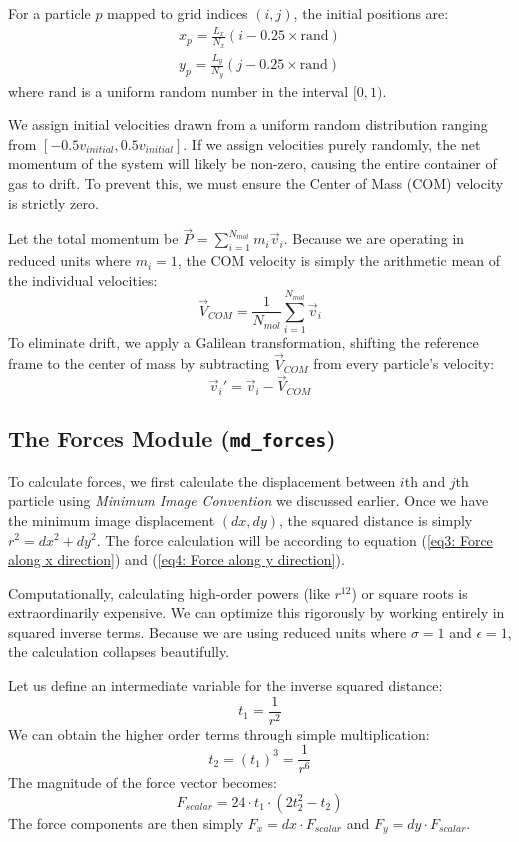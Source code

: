\documentclass[12pt, a4paper, oneside]{article}
\begin{document}
        For a particle $p$ mapped to grid indices $(i, j)$, the initial positions are:
        \begin{eqnarray*}
            x_p = \frac{L_x}{N_x}(i - 0.25 \times \text{rand}) \\
            y_p = \frac{L_y}{N_y}(j - 0.25 \times \text{rand})
        \end{eqnarray*}
        where $\text{rand}$ is a uniform random number in the interval $[0, 1)$.

        We assign initial velocities drawn from a uniform random distribution ranging from $[-0.5 v_{initial}, 0.5 v_{initial}]$. If we assign velocities purely randomly, the net momentum of the system will likely be non-zero, causing the entire container of gas to drift. To prevent this, we must ensure the Center of Mass (COM) velocity is strictly zero.
        
        Let the total momentum be $\vec{P} = \sum_{i=1}^{N_{mol}} m_i \vec{v}_i$. Because we are operating in reduced units where $m_i = 1$, the COM velocity is simply the arithmetic mean of the individual velocities:$$\vec{V}_{COM} = \frac{1}{N_{mol}} \sum_{i=1}^{N_{mol}} \vec{v}_i$$
        To eliminate drift, we apply a Galilean transformation, shifting the reference frame to the center of mass by subtracting $\vec{V}_{COM}$ from every particle's velocity:$$\vec{v}_i' = \vec{v}_i - \vec{V}_{COM}$$
        

        \subsection{The Forces Module (\texttt{md\_forces})}
        To calculate forces, we first calculate the displacement between $i$th and $j$th particle using \textit{Minimum Image Convention} we discussed earlier. Once we have the minimum image displacement $(dx, dy)$, the squared distance is simply $r^2 = dx^2 + dy^2$. The force calculation will be according to equation (\ref{eq3: Force along x direction}) and (\ref{eq4: Force along y direction}).

        Computationally, calculating high-order powers (like $r^{12}$) or square roots is extraordinarily expensive. We can optimize this rigorously by working entirely in squared inverse terms. Because we are using reduced units where $\sigma = 1$ and $\epsilon = 1$, the calculation collapses beautifully.

        Let us define an intermediate variable for the inverse squared distance: $$t_1 = \frac{1}{r^2}$$
        We can obtain the higher order terms through simple multiplication: $$t_2 = (t_1)^3 = \frac{1}{r^6}$$
        The magnitude of the force vector becomes: $$F_{scalar} = 24 \cdot t_1 \cdot (2 t_2^2 - t_2)$$
        The force components are then simply $F_x = dx \cdot F_{scalar}$ and $F_y = dy \cdot F_{scalar}$.
        
\end{document}

